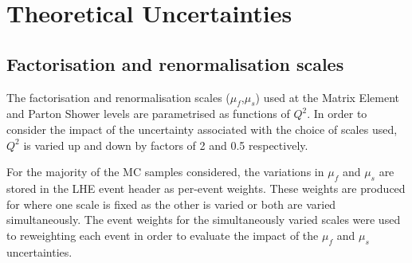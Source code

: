 %
%

\section{Theoretical Uncertainties}\label{sec:theorySysts}

\subsection{Factorisation and renormalisation scales}
The factorisation and renormalisation scales ($\mu_{f}$,$\mu_{s}$) used at the Matrix Element and Parton Shower levels are parametrised as functions of $Q^{2}$.
In order to consider the impact of the uncertainty associated with the choice of scales used, $Q^{2}$ is varied up and down by factors of 2 and 0.5 respectively.

For the majority of the MC samples considered, the variations in $\mu_{f}$ and $\mu_{s}$ are stored in the LHE event header as per-event weights.
These weights are produced for where one scale is fixed as the other is varied or both are varied simultaneously.
The event weights for the simultaneously varied scales were used to reweighting each event in order to evaluate the impact of the $\mu_{f}$ and $\mu_{s}$ uncertainties.


